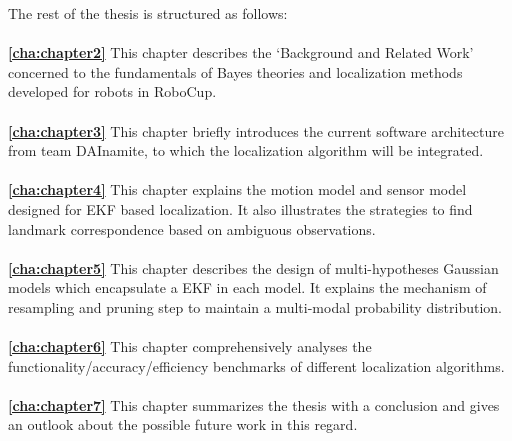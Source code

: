 The rest of the thesis is structured as follows:
\\
\\
\textbf{\autoref{cha:chapter2}} This chapter describes the `Background and Related Work' concerned to the fundamentals of Bayes theories and localization methods developed for robots in RoboCup. 
\\
\\
\textbf{\autoref{cha:chapter3}} This chapter briefly introduces the current software architecture from team DAInamite, to which the localization algorithm will be integrated.  
\\
\\
\textbf{\autoref{cha:chapter4}} This chapter explains the motion model and sensor model designed for \gls{EKF} based localization. It also illustrates the strategies to find landmark correspondence based on ambiguous observations. 
\\
\\
\textbf{\autoref{cha:chapter5}} This chapter describes the design of multi-hypotheses Gaussian models which encapsulate a \gls{EKF} in each model. It explains the mechanism of resampling and pruning step to maintain a multi-modal probability distribution.
\\
\\
\textbf{\autoref{cha:chapter6}} This chapter comprehensively analyses the functionality/accuracy/efficiency benchmarks of different localization algorithms.
\\
\\
\textbf{\autoref{cha:chapter7}} This chapter summarizes the thesis with a conclusion and gives an outlook about the possible future work in this regard.
\\
\\
